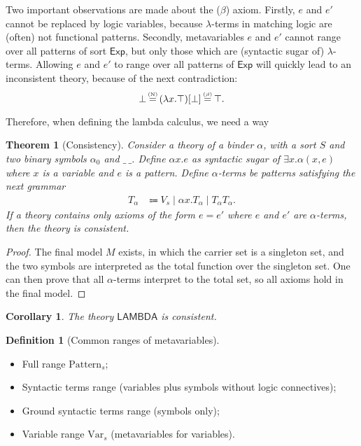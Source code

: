 \documentclass[UTF8]{article}
\newcounter{thmcounter}
\theoremstyle{plain}
\newtheorem{theorem}[thmcounter]{Theorem}
\newtheorem{corollary}[thmcounter]{Corollary}
\theoremstyle{definition}
\newtheorem{definition}[thmcounter]{Definition}
\theoremstyle{remark}
\newcommand{\LAMBDA}{\mathsf{LAMBDA}}
\newcommand{\xeq}[1]
    {\stackrel{\mathclap{\normalfont\tiny\mbox{#1}}}{=}}
\begin{document}
Two important observations are made about the ($\beta$) axiom. Firstly, $e$ and $e'$ cannot be replaced by logic variables, because $\lambda$-terms in matching logic are (often) not functional patterns. Secondly, metavariables $e$ and $e'$ cannot range over all patterns of sort $\mathsf{Exp}$, but only those which are (syntactic sugar of) $\lambda$-terms. Allowing $e$ and $e'$ to range over all patterns of $\mathsf{Exp}$ will quickly lead to an inconsistent theory, because of the next contradiction:
\begin{equation*}
\bot 
\xeq{(N)} (\lambda x . \top)[\bot]
\xeq{($\beta$)} \top.
\end{equation*}

Therefore, when defining the lambda calculus, we need a way 

\begin{theorem}[Consistency]
	Consider a theory of a binder $\alpha$, with a sort $S$ and two binary symbols $\alpha_0$ and $\_ \ \_$. Define $\alpha x . e$ as syntactic sugar of $\exists x . \alpha (x, e)$ where $x$ is a variable and $e$ is a pattern. Define $\alpha$-terms be patterns satisfying the next grammar 
	\begin{align*}
      T_\alpha &\Coloneqq V_s \mid \alpha x .T_\alpha \mid T_\alpha T_\alpha.
	\end{align*}
	If a theory contains only axioms of the form $e = e'$ where $e$ and $e'$ are $\alpha$-terms, then the theory is consistent.
\end{theorem}
\begin{proof}
	The final model $M$ exists, in which the carrier set is a singleton set, and the two symbols are interpreted as the total function over the singleton set. One can then prove that all $\alpha$-terms interpret to the total set, so all axioms hold in the final model.
\end{proof}

\begin{corollary}
	The theory $\LAMBDA$ is consistent.
\end{corollary}


\begin{definition}[Common ranges of metavariables]
\quad
\begin{itemize}
\item Full range $\mathrm{Pattern}_s$;
\item Syntactic terms range (variables plus symbols without logic connectives);
\item Ground syntactic terms range (symbols only); 
\item Variable range $\mathrm{Var}_s$ (metavariables for variables).
\end{itemize}
\end{definition}
\end{document}
